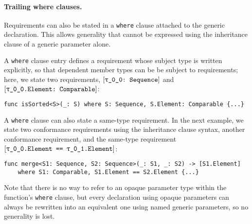 \documentclass[../generics]{subfiles}
\begin{document}
\paragraph{Trailing where clauses.} Requirements can also be stated in a \texttt{where} clause attached to the generic declaration. This allows generality that cannot be expressed using the inheritance clause of a generic parameter alone.

A \texttt{where} clause entry defines a requirement whose subject type is written explicitly, so that dependent member types can be be subject to requirements; here, we state two requirements, $\ConfReq{\rT}{Sequence}$ and $\ConfReq{\rT.Element}{Comparable}$:
\begin{Verbatim}
func isSorted<S>(_: S) where S: Sequence, S.Element: Comparable {...}
\end{Verbatim}

A \texttt{where} clause can also state a same-type requirement. In the next example, we state two conformance requirements using the inheritance clause syntax, another conformance requirement, and the same-type requirement $\SameReq{\rT.Element}{\rU.Element}$:
\begin{Verbatim}
func merge<S1: Sequence, S2: Sequence>(_: S1, _: S2) -> [S1.Element]
    where S1: Comparable, S1.Element == S2.Element {...}
\end{Verbatim}

Note that there is no way to refer to an opaque parameter type within the function's \texttt{where} clause, but every declaration using opaque parameters can always be rewritten into an equivalent one using named generic parameters, so no generality is lost.
\end{document}
